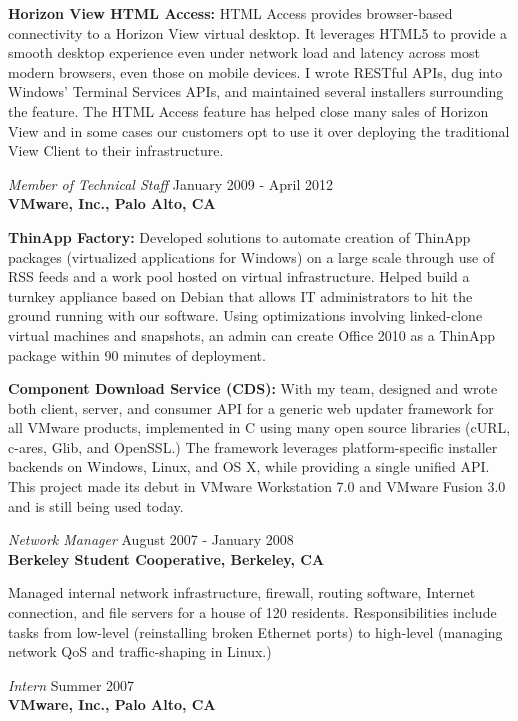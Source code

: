 \documentclass[overlapped,line,margin]{res}
\begin{document}
\begin{resume}
  \textbf{Horizon View HTML Access:} HTML Access provides browser-based
  connectivity to a Horizon View virtual desktop. It leverages HTML5 to provide
  a smooth desktop experience even under network load and latency across most
  modern browsers, even those on mobile devices. I wrote RESTful APIs, dug into
  Windows' Terminal Services APIs, and maintained several installers
  surrounding the feature. The HTML Access feature has helped close many sales
  of Horizon View and in some cases our customers opt to use it over deploying
  the traditional View Client to their infrastructure.

{\sl Member of Technical Staff} \hfill January 2009 - April 2012 \\
\textbf{VMware, Inc., Palo Alto, CA}

  \textbf{ThinApp Factory:} Developed solutions to automate creation of
  ThinApp packages (virtualized applications for Windows) on a large scale
  through use of RSS feeds and a work pool hosted on virtual infrastructure.
  Helped build a turnkey appliance based on Debian that allows IT
  administrators to hit the ground running with our software. Using
  optimizations involving linked-clone virtual machines and snapshots, an admin
  can create Office 2010 as a ThinApp package within 90 minutes of deployment.

  \textbf{Component Download Service (CDS):} With my team, designed and wrote
  both client, server, and consumer API for a generic web updater framework for
  all VMware products, implemented in C using many open source libraries (cURL,
  c-ares, Glib, and OpenSSL.) The framework leverages platform-specific
  installer backends on Windows, Linux, and OS X, while providing a single
  unified API. This project made its debut in VMware Workstation 7.0 and VMware
  Fusion 3.0 and is still being used today.

{\sl Network Manager} \hfill August 2007 - January 2008 \\
\textbf{Berkeley Student Cooperative, Berkeley, CA}

  Managed internal network infrastructure, firewall, routing
  software, Internet connection, and file servers for a house of 120 residents.
  Responsibilities include tasks from low-level (reinstalling broken Ethernet
  ports) to high-level (managing network QoS and traffic-shaping in Linux.)

{\sl Intern} \hfill Summer 2007 \\
\textbf{VMware, Inc., Palo Alto, CA}


\end{resume}
\end{document}
